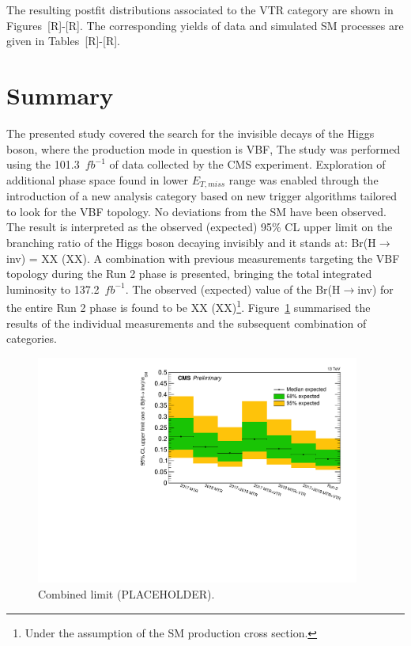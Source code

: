 \hspace{10pt} The resulting postfit distributions associated to the VTR category are shown in Figures~[R]-[R]. The corresponding yields of data and simulated SM processes are given in Tables~[R]-[R].


\section{Summary}
\hspace{10pt} The presented study covered the search for the invisible decays of the Higgs boson, where the production mode in question is VBF, The study was performed using the 101.3~$fb^{-1}$ of data collected by the CMS experiment. Exploration of additional phase space found in lower $E_{T,miss}$ range was enabled through the introduction of a new analysis category based on new trigger algorithms tailored to look for the VBF topology. No deviations from the SM have been observed. The result is interpreted as the observed (expected) 95\% CL upper limit on the branching ratio of the Higgs boson decaying invisibly and it stands at: Br(H$\rightarrow$inv) = XX (XX). A combination with previous measurements targeting the VBF topology during the Run 2 phase is presented, bringing the total integrated luminosity to 137.2~$fb^{-1}$. The observed (expected) value of the Br(H$\rightarrow$inv) for the entire Run 2 phase is found to be XX (XX)\footnote{Under the assumption of the SM production cross section.}. Figure~\ref{fig:combined_limit} summarised the results of the individual measurements and the subsequent combination of categories.

\begin{figure}[htbp]
  \centering
    \includegraphics[width= 0.95\textwidth]{Results/limit.pdf}
  \caption{Combined limit (PLACEHOLDER).}
  \label{fig:combined_limit}
\end{figure}